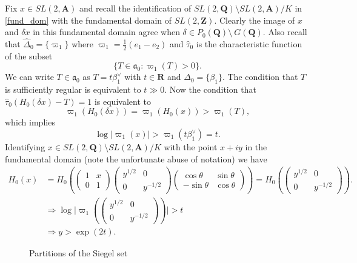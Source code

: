 \documentclass{ims9x6}
\def\A{\mathbf A}
\def\Q{\mathbf Q}
\def\R{\mathbf R}
\def\Z{\mathbf Z}
\def\aaa{\mathfrak a}
\def\bs{\setminus}
\def\mod#1{\lvert #1 \rvert} %
\begin{document}
Fix $x \in SL(2, \A)$ and recall the identification of $SL(2, \Q)\bs SL(2, \A) / K$ in \cref{fund_dom} with the fundamental domain of $SL(2, \Z)$. Clearly the image of $x$ and $\delta x$ in this fundamental domain agree when $\delta \in P_0(\Q)\bs~G(\Q)$. 
Also recall that $\hat\Delta_0 = \{\varpi_1\}$ where $\varpi_1 = \frac{1}{2}(e_1 - e_2)$ and $\hat \tau_0$ is the characteristic function of the subset 
\[ \{ T \in \aaa_0 : \varpi_1(T) > 0 \}. \]
We can write $T \in \aaa_0$ as $T = t \beta_1^\vee$ with $t \in \R$ and $\Delta_0 = \{\beta_1\}$. The condition that $T$ is sufficiently regular is equivalent to $t \gg 0$. Now the condition that $\hat\tau_0 (H_0(\delta x) - T) = 1$ is equivalent to 
\[ \varpi_1(H_0(\delta x)) = \varpi_1(H_0(x)) > \varpi_1(T), \]
which implies
\[ \log \mod{\varpi_1(x)} > \varpi_1(t \beta_1^\vee) = t. \]
Identifying $x \in SL(2, \Q)\bs SL(2, \A) / K$ with the point $x + iy$ in the fundamental domain (note the unfortunate abuse of notation) we have
\begin{equation} \label{x_decom}
	\begin{aligned} 
		H_0(x) & = H_0 \left(\begin{pmatrix} 1 & x \\ 0 & 1 \end{pmatrix} \begin{pmatrix} y^{1/2} & 0 \\ 0 & y^{-1/2} \end{pmatrix} \begin{pmatrix} \cos \theta & \sin \theta \\ -\sin \theta & \cos \theta \end{pmatrix} \right) 
		 = H_0 \left( \begin{pmatrix} y^{1/2} & 0 \\ 0 & y^{-1/2} \end{pmatrix} \right). \\
	& \Rightarrow \log \mod{\varpi_1(\begin{pmatrix} y^{1/2} & 0 \\ 0 & y^{-1/2} \end{pmatrix})} > t \\
	& \Rightarrow y > \exp(2t).
	\end{aligned}
\end{equation}

\begin{figure} 
\centering
\caption{Partitions of the Siegel set} \label{fig:sd}
\end{figure}
\end{document}
